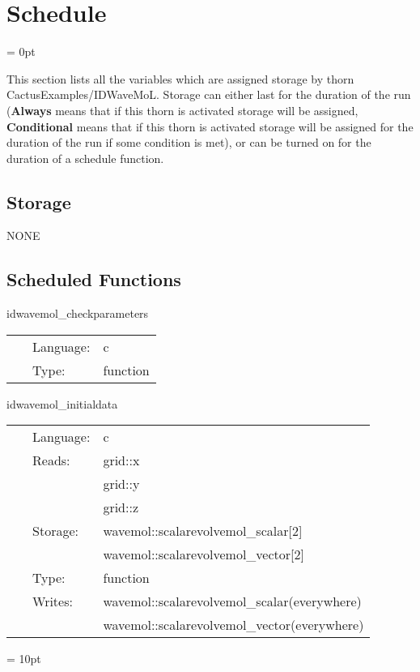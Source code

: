 
\section{Schedule} 


\parskip = 0pt


\noindent This section lists all the variables which are assigned storage by thorn CactusExamples/IDWaveMoL.  Storage can either last for the duration of the run ({\bf Always} means that if this thorn is activated storage will be assigned, {\bf Conditional} means that if this thorn is activated storage will be assigned for the duration of the run if some condition is met), or can be turned on for the duration of a schedule function.


\subsection*{Storage}NONE
\subsection*{Scheduled Functions}
\vspace{5mm}


\hspace{5mm} idwavemol\_checkparameters 

\hspace{5mm}{\it check parameters } 


\hspace{5mm}

 \begin{tabular*}{160mm}{cll} 
~ & Language:  & c \\ 
~ & Type:  & function \\ 
\end{tabular*} 


\vspace{5mm}


\hspace{5mm} idwavemol\_initialdata 

\hspace{5mm}{\it initial data for 3d wave equation } 


\hspace{5mm}

 \begin{tabular*}{160mm}{cll} 
~ & Language:  & c \\ 
~ & Reads:  & grid::x \\ 
~& ~ &grid::y\\ 
~& ~ &grid::z\\ 
~ & Storage:  & wavemol::scalarevolvemol\_scalar[2] \\ 
~& ~ &wavemol::scalarevolvemol\_vector[2]\\ 
~ & Type:  & function \\ 
~ & Writes:  & wavemol::scalarevolvemol\_scalar(everywhere) \\ 
~& ~ &wavemol::scalarevolvemol\_vector(everywhere)\\ 
\end{tabular*} 



\vspace{5mm}\parskip = 10pt 

